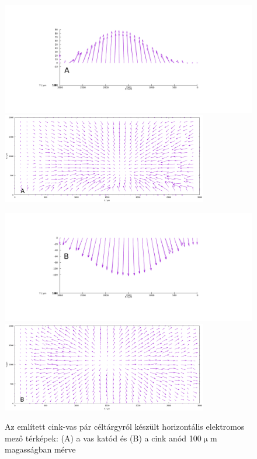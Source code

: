 \begin{figure}
\centering
\includegraphics[width=1\textwidth]{img/mérések/Fe_h100.pdf}
\includegraphics[width=0.8\textwidth]{img/mérések/Fe1_h100.pdf}

\includegraphics[width=1\textwidth]{img/mérések/Zn_h100.pdf}
\includegraphics[width=0.8\textwidth]{img/mérések/Zn1_h100.pdf}

\caption{Az említett cink-vas pár céltárgyról készült horizontális elektromos mező térképek:
(A) a vas katód és (B) a cink anód 100$\upmu$m magasságban mérve}
\label{fig:field_h}
\end{figure}

